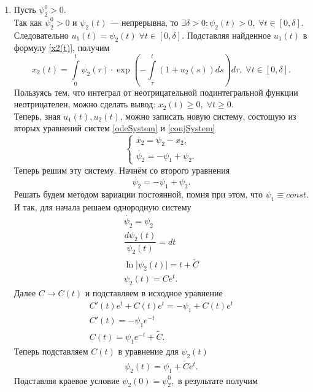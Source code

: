 \documentclass[11pt]{article}
\begin{document}
	\begin{enumerate}
		\item Пусть $ \psi_2^0 > 0. $ \\
		Так как $ \psi_2^0 > 0 $ и $ \psi_2(t) $ --- непрерывна, то $ \exists \delta > 0: \psi_2(t) > 0, \; \forall t \in [0, \delta]. $
		Следовательно $ u_1(t) = \psi_2(t) \; \forall t \in [0, \delta]. $ Подставляя найденное $ u_1(t) $ в формулу \eqref{x2(t)}, получим
		$$
			x_2(t) = \int \limits_0^t \psi_2(\tau) \cdot \exp \left(- \int \limits_\tau^t (1 + u_2(s)) ds \right) d\tau, \; \forall t \in [0, \delta].
		$$ 
		Пользуясь тем, что интеграл от неотрицательной подинтегральной функции  неотрицателен, можно сделать вывод: $ x_2(t) \geqslant 0, \; \forall t \geqslant 0. $ \\
		Теперь, зная $ u_1(t), u_2(t) $, можно записать новую систему, состощую из вторых уравнений систем \eqref{odeSystem} и \eqref{conjSystem}
		\begin{equation*}
			\begin{cases}
				\dot{x_2} = \psi_2 - x_2, \\
				\dot{\psi_2} = -\psi_1 + \psi_2.   		
			\end{cases}
   		\end{equation*}
   		Теперь решим эту систему. Начнём со второго уравнения
   		$$
   			\dot{\psi_2} = -\psi_1 + \psi_2.
   		$$
   		Решать будем методом вариации постоянной, помня при этом, что $ \psi_1 \equiv const. $ И так, для начала решаем однородную 
систему
   		\begin{gather*}
   			\dot{\psi_2} = \psi_2 \\
   			\dfrac{d \psi_2(t)}{\psi_2(t)} = dt \\
   			\ln \vert \psi_2(t) \vert = t + \tilde{C} \\
   			\psi_2(t) = C e^t.
   		\end{gather*}
   		Далее $ C \rightarrow C(t) $ и подставляем в исходное уравнение
   		\begin{gather*}
   			C'(t) e^t + C(t) e^t = -\psi_1 + C(t) e^t \\
   			C'(t) = - \psi_1 e^{-t} \\
   			C(t) = \psi_1 e^{-t} + \tilde{C}.
   		\end{gather*}
   		Теперь подставляем $ C(t) $ в уравнение для $ \psi_2(t) $
   		\begin{gather*}
			\psi_2(t) = \psi_1 + \tilde{C} e^t.   			
   		\end{gather*}
   		Подставляя краевое условие $ \psi_2(0) = \psi_2^0, $ в результате получим

\end{enumerate}
\end{document}
